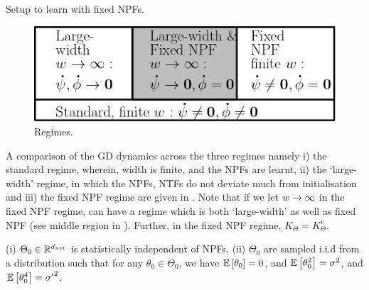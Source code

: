 \begin{table}[h]
\begin{minipage}{0.24\columnwidth}
{}
\end{minipage}
\caption{Setup to learn with fixed NPFs.}
\label{tb:dgn}
\end{table}
\begin{figure}
\includegraphics[scale=0.25]{figs/regime.png}
\caption{\label{fig:regime} Regimes.}
\end{figure}
A comparison of the GD dynamics across the three regimes namely i) the standard regime, wherein, width is finite, and the NPFs are learnt, ii) the `large-width' regime, in which the NPFs, NTFs do not deviate much from initialisation and iii) the fixed NPF regime are given in . Note that if we let $w\rightarrow\infty$ in the fixed NPF regime, can have a regime which is both `large-width' as well as fixed NPF (see middle region in ). Further, in the fixed NPF regime, $K_{\Theta}=K^v_{\Theta}$.
\FloatBarrier
\begin{table}[h]\centering
{}
\caption{Dynamics in various regimes. Here $p\in[P], s\in[n]$.}
\label{tb:dynamics}
\end{table}
\begin{assumption}\label{assmp:main}
(i) $\Theta_0\in\mathbb{R}^{d_{net}}$ is statistically independent of NPFs, (ii) $\Theta_0$ are sampled i.i.d from a distribution such that for any $\theta_0\in\Theta_0$,  we have $\mathbb{E}\left[\theta_0\right]=0$, and  $\mathbb{E}\left[\theta^2_0\right]=\sigma^2$, and $\mathbb{E}\left[\theta^4_0\right]={\sigma'}^2$.
\end{assumption}
